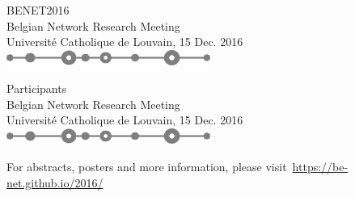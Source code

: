 \documentclass[12pt,a4paper]{article}
\begin{document}
\thispagestyle{empty}
\centering
  
{\huge BENET2016}\\[5pt]
Belgian Network Research Meeting\\[2pt]
{\large Université Catholique de Louvain, 15 Dec. 2016}\\[10pt]
\includegraphics[width=0.5\textwidth]{net-sep.pdf}\\


\vfill

\vfill

\newpage \thispagestyle{empty}

{\huge Participants}\\[5pt]
Belgian Network Research Meeting\\[2pt]
{\large Université Catholique de Louvain, 15 Dec. 2016}\\[10pt]
\includegraphics[width=0.5\textwidth]{net-sep.pdf}\\

\vfill

{\footnotesize }
\vfill

For abstracts, posters and more information,
please visit~\href{https://be-net.github.io/2016/}{https://be-net.github.io/2016/}
\end{document}
